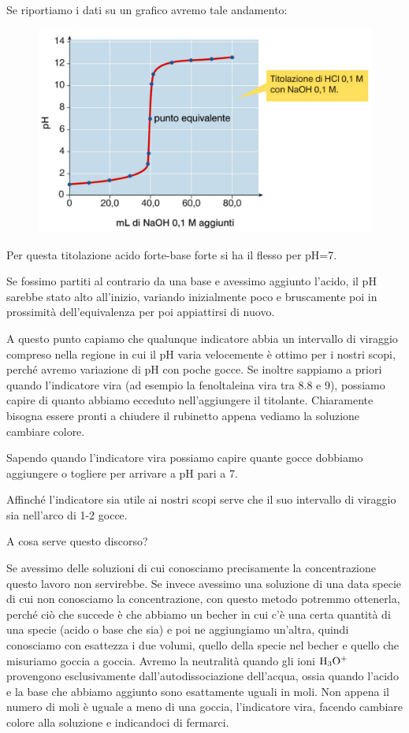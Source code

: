 Se riportiamo i dati su un grafico avremo tale andamento:

\begin{figure}[H]
    \hspace{1.3cm}\includegraphics[width=14cm]{immagini/titolazione_acido_forte_base_forte.png}
\end{figure}

Per questa titolazione acido forte-base forte si ha il flesso per pH=7.

Se fossimo partiti al contrario da una base e avessimo aggiunto l'acido, il pH sarebbe stato alto all'inizio, variando inizialmente poco e bruscamente poi in prossimità dell'equivalenza per poi appiattirsi di nuovo.

A questo punto capiamo che qualunque indicatore abbia un intervallo di viraggio compreso nella regione in cui il pH varia velocemente è ottimo per i nostri scopi, perché avremo variazione di pH con poche gocce. Se inoltre sappiamo a priori quando l'indicatore vira (ad esempio la fenoltaleina vira tra 8.8 e 9), possiamo capire di quanto abbiamo ecceduto nell'aggiungere il titolante. Chiaramente bisogna essere pronti a chiudere il rubinetto appena vediamo la soluzione cambiare colore.

Sapendo quando l'indicatore vira possiamo capire quante gocce dobbiamo aggiungere o togliere per arrivare a pH pari a 7.

Affinché l'indicatore sia utile ai nostri scopi serve che il suo intervallo di viraggio sia nell'arco di 1-2 gocce.

A cosa serve questo discorso?

Se avessimo delle soluzioni di cui conosciamo precisamente la concentrazione questo lavoro non servirebbe. Se invece avessimo una soluzione di una data specie di cui non conosciamo la concentrazione, con questo metodo potremmo ottenerla, perché ciò che succede è che abbiamo un becher in cui c'è una certa quantità di una specie (acido o base che sia) e poi ne aggiungiamo un'altra, quindi conosciamo con esattezza i due volumi, quello della specie nel becher e quello che misuriamo goccia a goccia. Avremo la neutralità quando gli ioni $\rm H_3O^+$ provengono esclusivamente dall'autodissociazione dell'acqua, ossia quando l'acido e la base che abbiamo aggiunto sono esattamente uguali in moli. Non appena il numero di moli è uguale a meno di una goccia, l'indicatore vira, facendo cambiare colore alla soluzione e indicandoci di fermarci.

